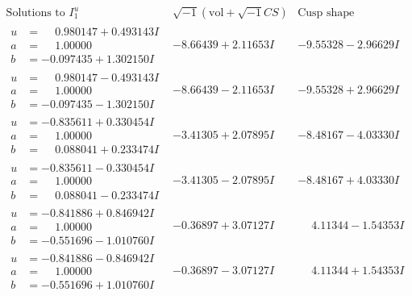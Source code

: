 \documentclass[1p]{elsarticle_modified}
\theoremstyle{definition}
\newcommand{\I}{\sqrt{-1}}
\begin{document}
$$\begin{array}{c|c|c}  
\text{Solutions to }I^u_{1}& \I (\text{vol} + \sqrt{-1}CS) & \text{Cusp shape}\\
 \hline 
\begin{aligned}
u &= \phantom{-}0.980147 + 0.493143 I \\
a &= \phantom{-}1.00000\phantom{ +0.000000I} \\
b &= -0.097435 + 1.302150 I\end{aligned}
 & -8.66439 + 2.11653 I & -9.55328 - 2.96629 I \\ \hline\begin{aligned}
u &= \phantom{-}0.980147 - 0.493143 I \\
a &= \phantom{-}1.00000\phantom{ +0.000000I} \\
b &= -0.097435 - 1.302150 I\end{aligned}
 & -8.66439 - 2.11653 I & -9.55328 + 2.96629 I \\ \hline\begin{aligned}
u &= -0.835611 + 0.330454 I \\
a &= \phantom{-}1.00000\phantom{ +0.000000I} \\
b &= \phantom{-}0.088041 + 0.233474 I\end{aligned}
 & -3.41305 + 2.07895 I & -8.48167 - 4.03330 I \\ \hline\begin{aligned}
u &= -0.835611 - 0.330454 I \\
a &= \phantom{-}1.00000\phantom{ +0.000000I} \\
b &= \phantom{-}0.088041 - 0.233474 I\end{aligned}
 & -3.41305 - 2.07895 I & -8.48167 + 4.03330 I \\ \hline\begin{aligned}
u &= -0.841886 + 0.846942 I \\
a &= \phantom{-}1.00000\phantom{ +0.000000I} \\
b &= -0.551696 - 1.010760 I\end{aligned}
 & -0.36897 + 3.07127 I & \phantom{-}4.11344 - 1.54353 I \\ \hline\begin{aligned}
u &= -0.841886 - 0.846942 I \\
a &= \phantom{-}1.00000\phantom{ +0.000000I} \\
b &= -0.551696 + 1.010760 I\end{aligned}
 & -0.36897 - 3.07127 I & \phantom{-}4.11344 + 1.54353 I \\ \hline\begin{aligned}

\end{aligned}
\end{array}$$
\end{document}
